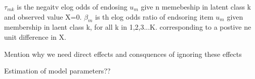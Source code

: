 $\tau_{mk}$ is the negaitv elog odds of endosing $u_{m}$ give n memebeship in latent class k and observed value X=0. 
$\beta_{m}$ is th elog odds ratio of endsoring item $u_{m}$ given membership in laent class k, for all k in 1,2,3...K. corresponding to a postive ne unit difference in X.

Mention why we need direct effects and consquences of ignoring these effects 

Estimation of model parameters?? 





